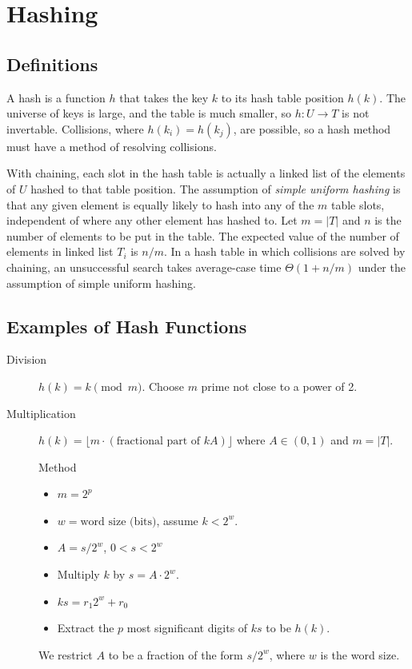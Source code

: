 \section{Hashing}

\subsection{Definitions}

A hash is a function $h$ that takes the key $k$ to its hash table position $h(k)$.  The universe of keys is large, and the table is much smaller, so $h:U \to T$ is not invertable.   Collisions, where $h(k_i) = h(k_j)$, are possible, so a hash method must have a method of resolving collisions.  

With chaining, each slot in the hash table is actually a linked list of the elements of $U$ hashed to that table position.  The assumption of {\it simple uniform hashing} is that any given element is equally likely to hash into any of the $m$ table slots, independent of where any other element has hashed to.  Let $m = |T|$ and $n$ is the number of elements to be put in the table.  The expected value of the number of elements in linked list $T_i$ is $n/m$.  In a hash table in which collisions are solved by chaining, an unsuccessful search takes average-case time $\Theta(1 + n/m)$ under the assumption of simple uniform hashing.  

\subsection{Examples of Hash Functions}

\begin{description}
	\item [Division] $h(k) = k \pmod m$.  Choose $m$ prime not close to a power of 2.
	\item [Multiplication] $h(k) = \lfloor  m\cdot (\text{fractional part of }kA) \rfloor$ where $A \in (0,1)$ and $m = |T|$.  
	
	Method
	\begin{itemize}
		\item $m = 2^p$
		\item $w = \text{word size (bits)}$, assume $k < 2^w$.
		\item $A = s/2^w$, $0 < s < 2^w$
		\item Multiply $k$ by $s = A \cdot 2^w$.
		\item $ks = r_1 2^w + r_0$
		\item Extract the $p$ most significant digits of $ks$ to be $h(k)$.  
	\end{itemize}
	
	We restrict $A$ to be a fraction of the form $s/2^w$, where $w$ is the word size.  
\end{description}

